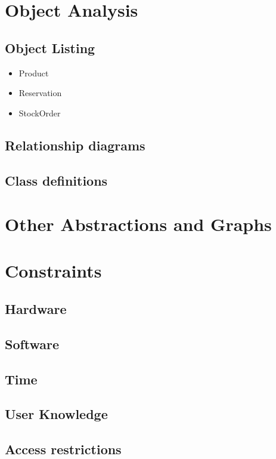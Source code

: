 \section{Object Analysis}


\subsection{Object Listing}
\begin{itemize}
	\item Product
	\item Reservation
	\item StockOrder
\end{itemize}
\subsection{Relationship diagrams}

\subsection{Class definitions}

\section{Other Abstractions and Graphs}

\section{Constraints}

\subsection{Hardware}

\subsection{Software}

\subsection{Time}

\subsection{User Knowledge}

\subsection{Access restrictions}


